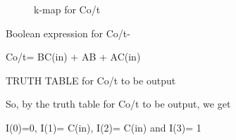 \documentclass{article}
\begin{document}
\begin{figure}[!ht]
\centering
{

}
\caption{k-map for Co/t}
\label{kmap Co/t}
\end{figure}
 
 Boolean expression for Co/t-

Co/t= BC(in) + AB + AC(in)

\begin{table}[!ht]
\centering
{

}
\caption{TRUTH TABLE for Co/t to be output}
\label{table 1 }
\end{table}
So, by the truth table for Co/t to be output,
we get 


{I(0)=0, I(1)= C(in), I(2)= C(in) and I(3)= 1}
\end{document}
